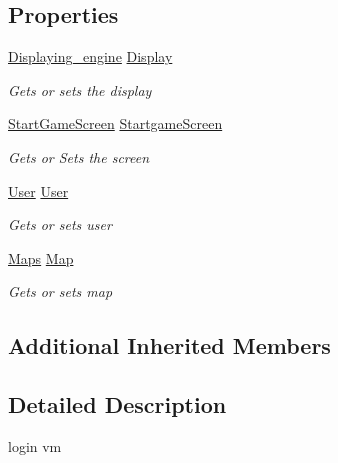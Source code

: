 \subsection*{Properties}
\begin{DoxyCompactItemize}
\item 
\hyperlink{class_lightdeath_1_1_displaying__engine}{Displaying\+\_\+engine} \hyperlink{class_lightdeath_1_1_viewmodel__login_a9e9f20161e479af012827444cd45bc03}{Display}
\begin{DoxyCompactList}\small\item\em Gets or sets the display \end{DoxyCompactList}\item 
\hyperlink{class_lightdeath_1_1_start_game_screen}{Start\+Game\+Screen} \hyperlink{class_lightdeath_1_1_viewmodel__login_abc617f5e0bb63db9eb6f04dff22d6bbf}{Startgame\+Screen}
\begin{DoxyCompactList}\small\item\em Gets or Sets the screen \end{DoxyCompactList}\item 
\hyperlink{class_lightdeath_1_1_user}{User} \hyperlink{class_lightdeath_1_1_viewmodel__login_a0636f3452aa3b6294a23ba4fb1319cfa}{User}
\begin{DoxyCompactList}\small\item\em Gets or sets user \end{DoxyCompactList}\item 
\hyperlink{class_lightdeath_1_1_maps}{Maps} \hyperlink{class_lightdeath_1_1_viewmodel__login_a9ba15fc864f74a123236b120571c8a1c}{Map}
\begin{DoxyCompactList}\small\item\em Gets or sets map \end{DoxyCompactList}\end{DoxyCompactItemize}
\subsection*{Additional Inherited Members}


\subsection{Detailed Description}
login vm 



